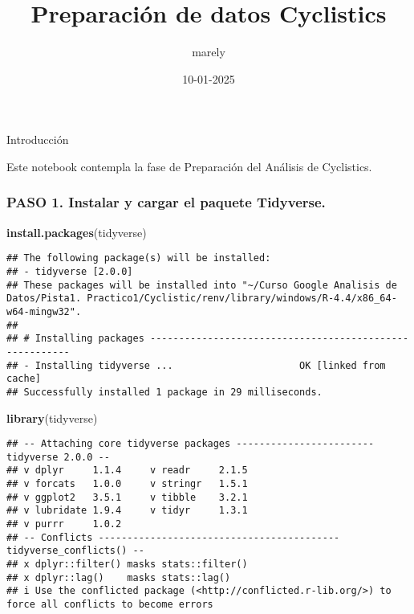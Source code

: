 \documentclass[
]{article}
\title{Preparación de datos Cyclistics}
\author{marely}
\date{10-01-2025}
\newenvironment{Shaded}{\begin{snugshade}}{\end{snugshade}}
\newcommand{\FunctionTok}[1]{\textcolor[rgb]{0.13,0.29,0.53}{\textbf{#1}}}
\newcommand{\NormalTok}[1]{#1}
\newcommand{\StringTok}[1]{\textcolor[rgb]{0.31,0.60,0.02}{#1}}
\begin{document}
\maketitle

Introducción

Este notebook contempla la fase de Preparación del Análisis de
Cyclistics.

\subsubsection{\texorpdfstring{\textbf{PASO 1.} Instalar y cargar el
paquete
Tidyverse.}{PASO 1. Instalar y cargar el paquete Tidyverse.}}\label{paso-1.-instalar-y-cargar-el-paquete-tidyverse.}

\begin{Shaded}
\begin{Highlighting}[]
\FunctionTok{install.packages}\NormalTok{(}\StringTok{\textquotesingle{}tidyverse\textquotesingle{}}\NormalTok{)}
\end{Highlighting}
\end{Shaded}

\begin{verbatim}
## The following package(s) will be installed:
## - tidyverse [2.0.0]
## These packages will be installed into "~/Curso Google Analisis de Datos/Pista1. Practico1/Cyclistic/renv/library/windows/R-4.4/x86_64-w64-mingw32".
## 
## # Installing packages --------------------------------------------------------
## - Installing tidyverse ...                      OK [linked from cache]
## Successfully installed 1 package in 29 milliseconds.
\end{verbatim}

\begin{Shaded}
\begin{Highlighting}[]
\FunctionTok{library}\NormalTok{(tidyverse)}
\end{Highlighting}
\end{Shaded}

\begin{verbatim}
## -- Attaching core tidyverse packages ------------------------ tidyverse 2.0.0 --
## v dplyr     1.1.4     v readr     2.1.5
## v forcats   1.0.0     v stringr   1.5.1
## v ggplot2   3.5.1     v tibble    3.2.1
## v lubridate 1.9.4     v tidyr     1.3.1
## v purrr     1.0.2     
## -- Conflicts ------------------------------------------ tidyverse_conflicts() --
## x dplyr::filter() masks stats::filter()
## x dplyr::lag()    masks stats::lag()
## i Use the conflicted package (<http://conflicted.r-lib.org/>) to force all conflicts to become errors
\end{verbatim}
\end{document}

